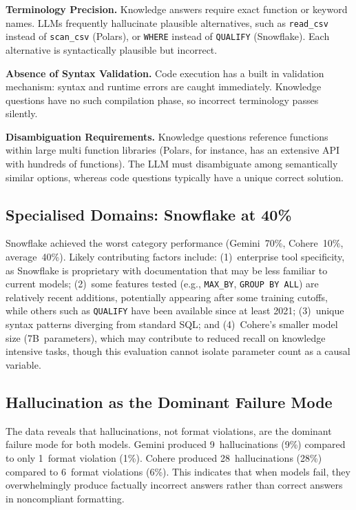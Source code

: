 \documentclass[12pt,a4paper]{article}
\begin{document}
\textbf{Terminology Precision.} Knowledge answers require exact function or keyword names. LLMs frequently hallucinate plausible alternatives, such as \texttt{read\_csv} instead of \texttt{scan\_csv} (Polars), or \texttt{WHERE} instead of \texttt{QUALIFY} (Snowflake). Each alternative is syntactically plausible but incorrect.

\textbf{Absence of Syntax Validation.} Code execution has a built in validation mechanism: syntax and runtime errors are caught immediately. Knowledge questions have no such compilation phase, so incorrect terminology passes silently.

\textbf{Disambiguation Requirements.} Knowledge questions reference functions within large multi function libraries (Polars, for instance, has an extensive API with hundreds of functions). The LLM must disambiguate among semantically similar options, whereas code questions typically have a unique correct solution.

\subsection{Specialised Domains: Snowflake at 40\%}

Snowflake achieved the worst category performance (Gemini~70\%, Cohere~10\%, average~40\%). Likely contributing factors include: (1)~enterprise tool specificity, as Snowflake is proprietary with documentation that may be less familiar to current models; (2)~some features tested (e.g., \texttt{MAX\_BY}, \texttt{GROUP BY ALL}) are relatively recent additions, potentially appearing after some training cutoffs, while others such as \texttt{QUALIFY} have been available since at least 2021; (3)~unique syntax patterns diverging from standard SQL; and (4)~Cohere's smaller model size (7B~parameters), which may contribute to reduced recall on knowledge intensive tasks, though this evaluation cannot isolate parameter count as a causal variable.

\subsection{Hallucination as the Dominant Failure Mode}

The data reveals that hallucinations, not format violations, are the dominant failure mode for both models. Gemini produced 9~hallucinations (9\%) compared to only 1~format violation (1\%). Cohere produced 28~hallucinations (28\%) compared to 6~format violations (6\%). This indicates that when models fail, they overwhelmingly produce factually incorrect answers rather than correct answers in noncompliant formatting.
\end{document}
